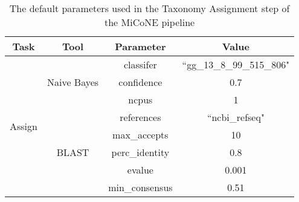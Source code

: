 \begin{table}[H]
\centering
\small
\begin{tabular}{|c|c|c|c|}
\hline
\textbf{Task}           & \textbf{Tool}                & \textbf{Parameter} & \textbf{Value}            \\ \hline
\multirow{8}{*}{Assign} & \multirow{3}{*}{Naive Bayes} & classifer          & ``gg\_13\_8\_99\_515\_806" \\
                        &                              & confidence         & 0.7                       \\
                        &                              & ncpus              & 1                         \\ \cline{2-4}
                        & \multirow{5}{*}{BLAST}       & references         & ``ncbi\_refseq"            \\
                        &                              & max\_accepts       & 10                        \\
                        &                              & perc\_identity     & 0.8                       \\
                        &                              & evalue             & 0.001                     \\
                        &                              & min\_consensus     & 0.51                      \\ \hline
\end{tabular}
\caption{The default parameters used in the Taxonomy Assignment step of the MiCoNE pipeline}
\label{tab:ta_parameters}
\end{table}

